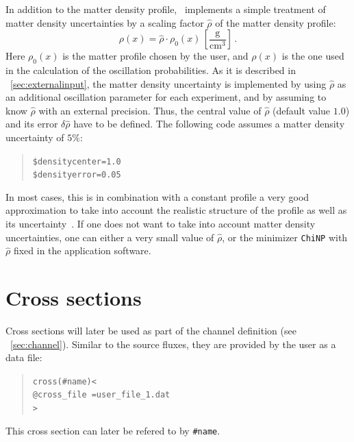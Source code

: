 In addition to the matter density profile, \GLOBES\ implements a simple treatment of matter density uncertainties by a scaling factor $\hat{\rho}$
of the matter density profile:
\begin{equation}
\label{eq:density_error}
\rho(x)=\hat{\rho} \cdot\rho_0(x)\,\left[\frac{\mathrm{g}}{\mathrm{cm}^3}\right] \, .
\end{equation}
Here $\rho_0(x)$ is the matter profile chosen by the user, and $\rho(x)$ is
the one used in the calculation of the oscillation probabilities. As it is described in \Sec~\ref{sec:externalinput}, the matter density uncertainty is implemented by using $\hat{\rho}$ as an additional oscillation parameter for each experiment, and by assuming to know $\hat{\rho}$ with an external precision. Thus, the central value of $\hat{\rho}$ (default value $1.0$) and its error $\delta \hat{\rho}$ have to be defined. The following code assumes a matter density uncertainty of $5\%$:
\begin{quote}
 {\tt \$densitycenter=1.0} \\
 {\tt \$densityerror=0.05}
\end{quote}
In most cases, this is in combination with a constant profile a very good approximation to take into account the realistic structure of the profile as well as its uncertainty~\cite{Ohlsson:2003ip}. 
 If one does not want to take into account  matter density uncertainties, 
one can either a very small value of $\hat{\rho}$, or the minimizer {\tt ChiNP} with $\hat{\rho}$ fixed in the application software.


\section{Cross sections}
\label{sec:cross_section}

Cross sections will later be used as part of the 
channel definition (see \Sec~\ref{sec:channel}). Similar to the source 
fluxes, they are provided by the user as a data file:
\begin{quote}
{\tt cross(\#name)<}\\
{\tt \tb @cross\_file =user\_file\_1.dat}\\
{\tt >}
\end{quote}  
This cross section can later be refered to by {\tt \#name}.

